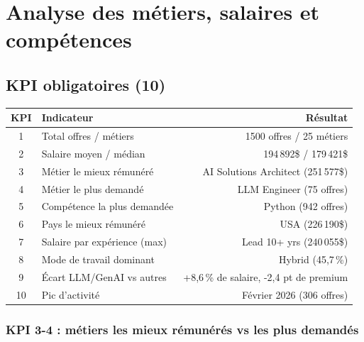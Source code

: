 \chapter{Analyse des métiers, salaires et compétences}

\section{KPI obligatoires (10)}

\begin{center}
\small
\begin{tabular}{clr}
\toprule
KPI & Indicateur & Résultat \\
\midrule
1 & Total offres / métiers & 1500 offres / 25 métiers \\
2 & Salaire moyen / médian & 194\,892\$ / 179\,421\$ \\
3 & Métier le mieux rémunéré & AI Solutions Architect (251\,577\$) \\
4 & Métier le plus demandé & LLM Engineer (75 offres) \\
5 & Compétence la plus demandée & Python (942 offres) \\
6 & Pays le mieux rémunéré & USA (226\,190\$) \\
7 & Salaire par expérience (max) & Lead 10+ yrs (240\,055\$) \\
8 & Mode de travail dominant & Hybrid (45,7\,\%) \\
9 & Écart LLM/GenAI vs autres & +8,6\,\% de salaire, -2,4 pt de premium \\
10 & Pic d'activité & Février 2026 (306 offres) \\
\bottomrule
\end{tabular}
\end{center}

\subsection{KPI 3-4 : métiers les mieux rémunérés vs les plus demandés}

